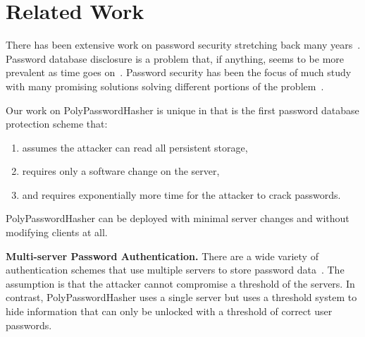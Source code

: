 \section{Related Work} \label{sec-related}


There has been extensive work on password security stretching back many
years~\cite{morris1979password,klein1990foiling, florencio2007large}.   
Password database disclosure is a problem that, if anything, seems to be
more prevalent as time goes on~\cite{clair2006password,miranteTR13,passwordresearchblog}.
Password security has been the focus of much study with many promising 
solutions solving different portions of the problem~\cite{tsai2006password}.

Our work on PolyPasswordHasher is unique in that is the first password database
protection scheme that:
\begin{enumerate}
\item assumes the attacker can read all persistent storage,
\item requires only a software change on the server,
\item and requires exponentially more time for the attacker to crack passwords.
\end{enumerate}

PolyPasswordHasher can be deployed with minimal server changes and without modifying 
clients at all.   

{\bf Multi-server Password Authentication.}
There are a wide variety of authentication schemes that use multiple servers
to store password data~\cite{Chai20071046,bagherzandi2011password, katz2005two}.
The assumption is that the attacker cannot compromise a threshold of
the servers.  In contrast, PolyPasswordHasher uses a single server but uses
a threshold system to hide information that can only be unlocked
with a threshold of correct user passwords.

